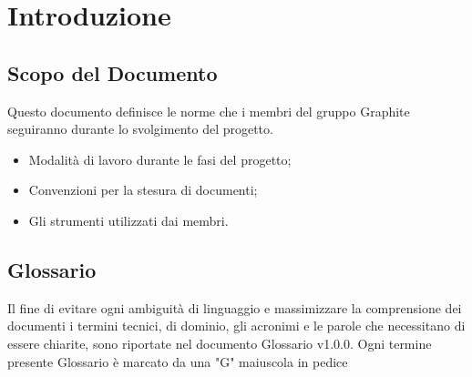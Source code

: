 \documentclass[./NormediProgetto.tex]{subfiles}
\begin{document}
	
\chapter{Introduzione}
\section{Scopo del Documento}
Questo documento definisce le norme che i membri del gruppo Graphite seguiranno durante lo svolgimento del progetto.
\begin{itemize}
\item Modalità di lavoro durante le fasi del progetto;
\item Convenzioni per la stesura di documenti;
\item Gli strumenti utilizzati dai membri.

\end{itemize}
\section{Glossario}
Il fine di evitare ogni ambiguità di linguaggio e massimizzare la comprensione dei documenti i termini tecnici, di dominio, gli acronimi e le parole che necessitano di essere chiarite, sono riportate nel documento Glossario v1.0.0.
Ogni termine presente Glossario è marcato da una "G" maiuscola in pedice
\end{document}
